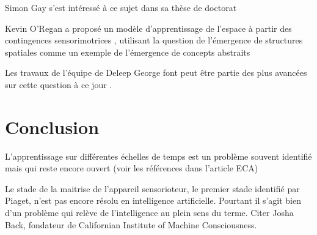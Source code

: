 Simon Gay s'est intéressé à ce sujet dans sa thèse de doctorat \cite{gay_autonomous_2017} 

Kevin O'Regan a proposé un modèle d'apprentissage de l'espace à partir des contingences sensorimotrices \cite{terekhov_learning_2019},  utilisant la question de l'émergence de structures spatiales comme un exemple de l'émergence de concepts abstraits


Les travaux de l'équipe de Deleep George font peut être partie des plus avancées sur cette question à ce jour \cite{raju_space_2022}.




\section{Conclusion}

L'apprentissage sur différentes échelles de temps est un problème souvent identifié mais qui reste encore ouvert 
(voir les références dans l'article ECA)

Le stade de la maitrise de l'appareil sensorioteur, le premier stade identifié par Piaget, n'est pas encore résolu en intelligence artificielle. Pourtant il s'agit bien d'un problème qui relève de l'intelligence au plein sens du terme. Citer Josha Back, fondateur de Californian Institute of Machine Consciousness.